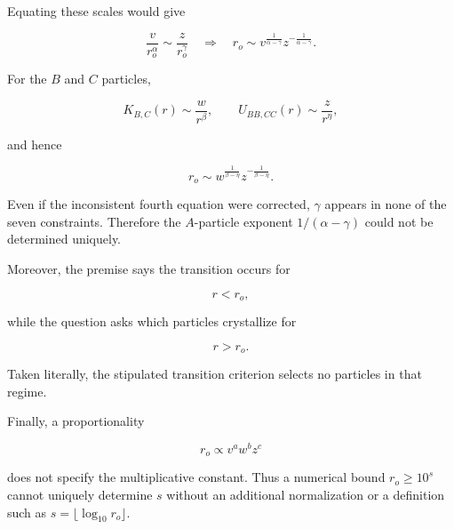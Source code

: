 Equating these scales would give

\[
\frac{v}{r_o^\alpha}\sim\frac{z}{r_o^\gamma} \quad\Longrightarrow\quad r_o\sim v^{\frac1{\alpha-\gamma}} z^{-\frac1{\alpha-\gamma}}.
\]

For the $B$ and $C$ particles,

\[
K_{B,C}(r)\sim\frac{w}{r^\beta}, \qquad U_{BB,CC}(r)\sim\frac{z}{r^\eta},
\]

and hence

\[
r_o\sim w^{\frac1{\beta-\eta}} z^{-\frac1{\beta-\eta}}.
\]

Even if the inconsistent fourth equation were corrected, $\gamma$ appears in none of the seven constraints. Therefore the $A$-particle exponent $1/(\alpha-\gamma)$ could not be determined uniquely.

Moreover, the premise says the transition occurs for

\[
r<r_o,
\]

while the question asks which particles crystallize for

\[
r>r_o.
\]

Taken literally, the stipulated transition criterion selects no particles in that regime.

Finally, a proportionality

\[
r_o\propto v^a w^b z^c
\]

does not specify the multiplicative constant. Thus a numerical bound $r_o\geq 10^s$ cannot uniquely determine $s$ without an additional normalization or a definition such as $s=\lfloor\log_{10}r_o\rfloor$.
